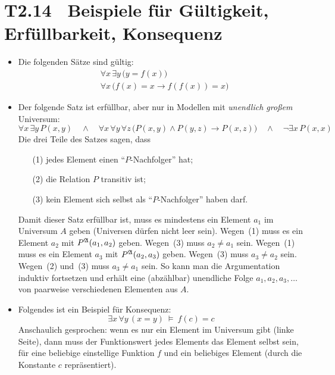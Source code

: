 \documentclass[fontsize=11pt, twoside=false, numbers=autoenddot]{scrbook}
\begin{document}
\section*{T2.14~ Beispiele für Gültigkeit, Erfüllbarkeit, Konsequenz}

\begin{itemize}
  \item
    Die folgenden Sätze sind gültig:
    \begin{align*}
      & \forall x\, \exists y\, \Big(y = f(x)\Big) \\
      & \forall x\, \Big( f(x) = x \to f(f(x)) = x \Big)
    \end{align*}
  \item
    Der folgende Satz ist erfüllbar, aber nur in Modellen mit \emph{unendlich großem} Universum:
    \[
      \forall x\, \exists y\, P(x,y)
      \quad\land\quad
      \forall x\,\forall y\,\forall z\, \Big( P(x,y) \land P(y,z) \to P(x,z) \Big)
      \quad\land\quad
      \lnot \exists x\,P(x,x)
    \]
    Die drei Teile des Satzes sagen, dass 
    \begin{enumerate}
      \item[(1)]
        jedes Element einen "`$P$-Nachfolger"' hat;
      \item[(2)]
        die Relation $P$ transitiv ist;
      \item[(3)]
        kein Element sich selbst als "`$P$-Nachfolger"' haben darf.
    \end{enumerate}
    Damit dieser Satz erfüllbar ist, muss es mindestens ein Element $a_1$ im Universum $A$ geben
    (Universen dürfen nicht leer sein).
    Wegen~(1) muss es ein Element $a_2$ mit $P^\mathfrak{A}(a_1,a_2)$ geben.
    Wegen~(3) muss $a_2 \neq a_1$ sein.
    Wegen~(1) muss es ein Element $a_3$ mit $P^\mathfrak{A}(a_2,a_3)$ geben.
    Wegen~(3) muss $a_3 \neq a_2$ sein.
    Wegen~(2) und~(3) muss $a_3 \neq a_1$ sein.
    So kann man die Argumentation induktiv fortsetzen und erhält eine (abzählbar) unendliche Folge
    $a_1,a_2,a_3,\dots$ von paarweise verschiedenen Elementen aus $A$.
    \par\smallskip
  \item
    Folgendes ist ein Beispiel für Konsequenz:
    \[
      \exists x\, \forall y\, (x=y)
      ~\models~
      f(c) = c
    \]
    Anschaulich gesprochen: wenn es nur ein Element im Universum gibt (linke Seite),
    dann muss der Funktionswert jedes Elements das Element selbst sein,
    für eine beliebige einstellige Funktion $f$ und ein beliebiges Element
    (durch die Konstante $c$ repräsentiert).
\end{itemize}
\end{document}
